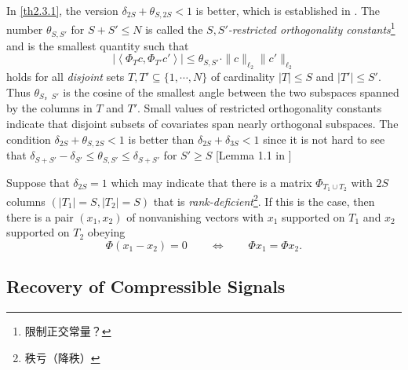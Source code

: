 In \cref{th2.3.1}, the version $\delta_{2S}+\theta_{S,2S}<1$ is better, which is established in \cite{19}. The number $\theta_{S,S'}$ for $S+S'\leq N$ is called the \textcolor[rgb]{1,0,0}{\emph{$S,S'$-restricted orthogonality constants}}\footnote{限制正交常量？} and is the smallest quantity such that
\begin{equation}
\label{eq2.3.3}
\left| \left\langle \Phi_Tc,\Phi_{T'}c' \right\rangle \right| \leq \theta_{S,S'} \cdot \|c\|_{\ell_2}\|c'\|_{\ell_2}
\end{equation}
holds for all \emph{disjoint} sets $T,T'\subseteq \{1,\cdots,N\}$ of cardinality $|T| \leq S$ and $|T'| \leq S'$. Thus $\theta_{S，S'}$ is the cosine of the smallest angle between the two subspaces spanned by the columns in $T$ and $T'$. Small values of restricted orthogonality constants indicate that disjoint subsets of covariates span nearly orthogonal subspaces. The condition $\delta_{2S}+\theta_{S,2S}<1$ is better than $\delta_{2S}+\delta_{3S}<1$ since it is not hard to see that $\delta_{S+S'}-\delta_{S'} \leq \theta_{S,S'} \leq \delta_{S+S'}$ for $S'\geq S$ [Lemma 1.1 in \cite{15}]

Suppose that $\delta_{2S}=1$ which may indicate that there is a matrix $\Phi_{T_1\cup T_2}$ with $2S$ columns $(|T_1|=S,|T_2|=S)$ that is \emph{rank-deficient}\footnote{秩亏（降秩）}. If this is the case, then there is a pair $(x_1, x_2)$ of nonvanishing vectors with $x_1$ supported on $T_1$ and $x_2$ supported on $T_2$ obeying
\[
\Phi(x_1-x_2)=0 \qquad \Leftrightarrow \qquad \Phi x_1 = \Phi x_2.
\]

\subsection{Recovery of Compressible Signals}

























 

